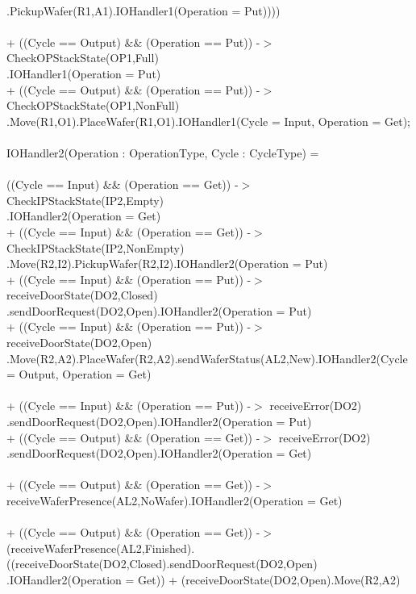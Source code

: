 \documentclass[a4paper,12pt]{article}
\begin{document}
	\\.PickupWafer(R1,A1).IOHandler1(Operation = Put))))
	\\
	\\+ ((Cycle == Output) \&\& (Operation == Put)) -$>$ CheckOPStackState(OP1,Full)
	\\.IOHandler1(Operation = Put)
	\\+ ((Cycle == Output) \&\& (Operation == Put)) -$>$ CheckOPStackState(OP1,NonFull)
	\\.Move(R1,O1).PlaceWafer(R1,O1).IOHandler1(Cycle = Input, Operation = Get);
	\\
	\\IOHandler2(Operation : OperationType, Cycle : CycleType) =
	\\
	\\((Cycle == Input) \&\& (Operation == Get)) -$>$ CheckIPStackState(IP2,Empty)
	\\.IOHandler2(Operation = Get)
	\\+ ((Cycle == Input) \&\& (Operation == Get)) -$>$ CheckIPStackState(IP2,NonEmpty)
	\\.Move(R2,I2).PickupWafer(R2,I2).IOHandler2(Operation = Put)
	\\+ ((Cycle == Input) \&\& (Operation == Put)) -$>$ receiveDoorState(DO2,Closed)
	\\.sendDoorRequest(DO2,Open).IOHandler2(Operation = Put)
	\\+ ((Cycle == Input) \&\& (Operation == Put)) -$>$ receiveDoorState(DO2,Open)
	\\.Move(R2,A2).PlaceWafer(R2,A2).sendWaferStatus(AL2,New).IOHandler2(Cycle = Output, Operation = Get)
	\\
	\\+ ((Cycle == Input) \&\& (Operation == Put)) -$>$ receiveError(DO2)
	\\.sendDoorRequest(DO2,Open).IOHandler2(Operation = Put)
	\\+ ((Cycle == Output) \&\& (Operation == Get)) -$>$ receiveError(DO2)
	\\.sendDoorRequest(DO2,Open).IOHandler2(Operation = Get)
	\\
	\\+ ((Cycle == Output) \&\& (Operation == Get)) -$>$ receiveWaferPresence(AL2,NoWafer).IOHandler2(Operation = Get)
	\\
	\\+ ((Cycle == Output) \&\& (Operation == Get)) -$>$ (receiveWaferPresence(AL2,Finished).((receiveDoorState(DO2,Closed).sendDoorRequest(DO2,Open)
	\\.IOHandler2(Operation = Get)) + (receiveDoorState(DO2,Open).Move(R2,A2)
\end{document}
